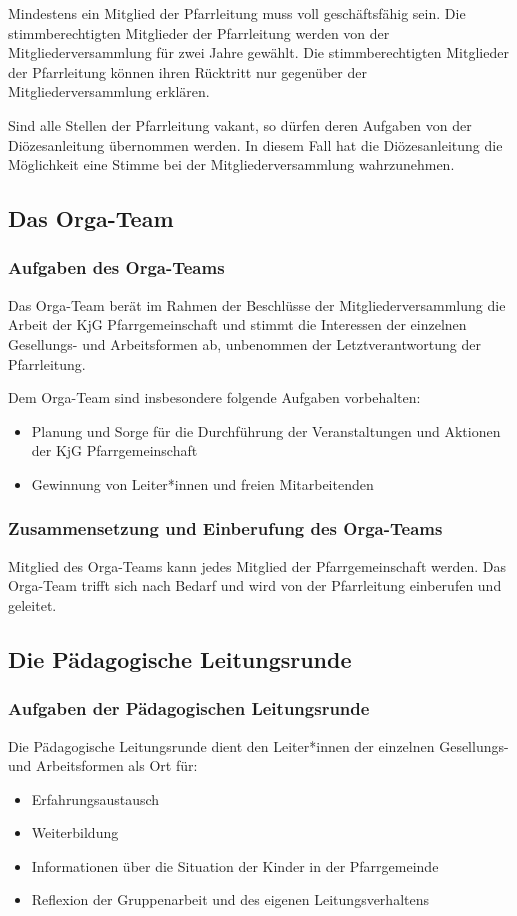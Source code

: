 \documentclass[12pt]{report}
\begin{document}
\begin{flushleft}
Mindestens ein Mitglied der Pfarrleitung muss voll geschäftsfähig sein.
Die stimmberechtigten Mitglieder der Pfarrleitung werden von der Mitgliederversammlung für
zwei Jahre gewählt. Die stimmberechtigten Mitglieder der Pfarrleitung können ihren Rücktritt nur
gegenüber der Mitgliederversammlung erklären.

Sind alle Stellen der Pfarrleitung vakant, so dürfen deren Aufgaben von der
Diözesanleitung übernommen werden. In diesem Fall hat die Diözesanleitung die Möglichkeit eine
Stimme bei der Mitgliederversammlung wahrzunehmen.

\subsection{Das Orga-Team}

\subsubsection{Aufgaben des Orga-Teams}

Das Orga-Team berät im Rahmen der Beschlüsse der Mitgliederversammlung die Arbeit der KjG
Pfarrgemeinschaft und stimmt die Interessen der einzelnen Gesellungs- und Arbeitsformen ab,
unbenommen der Letztverantwortung der Pfarrleitung.

Dem Orga-Team sind insbesondere folgende Aufgaben vorbehalten:
\begin{itemize}
  \item Planung und Sorge für die Durchführung der Veranstaltungen und Aktionen der KjG Pfarrgemeinschaft
  \item Gewinnung von Leiter*innen und freien Mitarbeitenden
\end{itemize}

\subsubsection{Zusammensetzung und Einberufung des Orga-Teams}
Mitglied des Orga-Teams kann jedes Mitglied der Pfarrgemeinschaft werden. Das Orga-Team
trifft sich nach Bedarf und wird von der Pfarrleitung einberufen und geleitet.

\subsection{Die Pädagogische Leitungsrunde}

\subsubsection{Aufgaben der Pädagogischen Leitungsrunde}
Die Pädagogische Leitungsrunde dient den Leiter*innen der einzelnen Gesellungs- und Arbeitsformen als Ort für:
\begin{itemize}
  \item Erfahrungsaustausch
  \item Weiterbildung
  \item Informationen über die Situation der {\color{red} Kinder} in der Pfarrgemeinde
  \item Reflexion der Gruppenarbeit und des eigenen Leitungsverhaltens
\end{itemize}


\end{flushleft}
\end{document}
